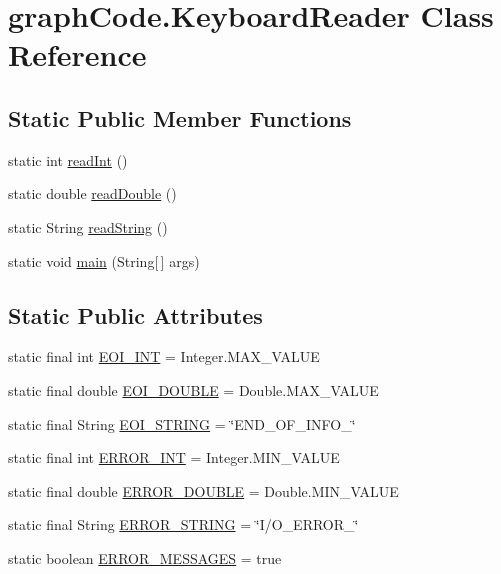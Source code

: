 \hypertarget{classgraphCode_1_1KeyboardReader}{}\section{graph\+Code.\+Keyboard\+Reader Class Reference}
\label{classgraphCode_1_1KeyboardReader}
\subsection*{Static Public Member Functions}
\begin{DoxyCompactItemize}
\item 
static int \hyperlink{classgraphCode_1_1KeyboardReader_add978b1e4a585c5d7ab75113af2c42fa}{read\+Int} ()
\item 
static double \hyperlink{classgraphCode_1_1KeyboardReader_ac9ff0d97d041350b957dce4822813ba0}{read\+Double} ()
\item 
static String \hyperlink{classgraphCode_1_1KeyboardReader_a675b8013d5093b880c8988ca4e4dacd8}{read\+String} ()
\item 
static void \hyperlink{classgraphCode_1_1KeyboardReader_ad9d8ce7d07df5662e713542d7a813ff9}{main} (String\mbox{[}$\,$\mbox{]} args)
\end{DoxyCompactItemize}
\subsection*{Static Public Attributes}
\begin{DoxyCompactItemize}
\item 
static final int \hyperlink{classgraphCode_1_1KeyboardReader_ad3188717707def9a8e8d6397646365ef}{E\+O\+I\+\_\+\+I\+NT} = Integer.\+M\+A\+X\+\_\+\+V\+A\+L\+UE
\item 
static final double \hyperlink{classgraphCode_1_1KeyboardReader_ad8288436031edae30b500dbb7ac05960}{E\+O\+I\+\_\+\+D\+O\+U\+B\+LE} = Double.\+M\+A\+X\+\_\+\+V\+A\+L\+UE
\item 
static final String \hyperlink{classgraphCode_1_1KeyboardReader_ac53bec259e91a7ca66bbc88d358a162b}{E\+O\+I\+\_\+\+S\+T\+R\+I\+NG} = \char`\"{}E\+N\+D\+\_\+\+O\+F\+\_\+\+I\+N\+F\+O\+\_\char`\"{}
\item 
static final int \hyperlink{classgraphCode_1_1KeyboardReader_a1169f29de6725738bebd5449cf6da367}{E\+R\+R\+O\+R\+\_\+\+I\+NT} = Integer.\+M\+I\+N\+\_\+\+V\+A\+L\+UE
\item 
static final double \hyperlink{classgraphCode_1_1KeyboardReader_ad4574418c09a66cfb44580e8a2105686}{E\+R\+R\+O\+R\+\_\+\+D\+O\+U\+B\+LE} = Double.\+M\+I\+N\+\_\+\+V\+A\+L\+UE
\item 
static final String \hyperlink{classgraphCode_1_1KeyboardReader_a5afecbc3f6ef9e6d54e0513d67b284aa}{E\+R\+R\+O\+R\+\_\+\+S\+T\+R\+I\+NG} = \char`\"{}I/O\+\_\+\+E\+R\+R\+O\+R\+\_\char`\"{}
\item 
static boolean \hyperlink{classgraphCode_1_1KeyboardReader_aa3d3742806e17ff6013ef7f5e37bef9f}{E\+R\+R\+O\+R\+\_\+\+M\+E\+S\+S\+A\+G\+ES} = true
\end{DoxyCompactItemize}


